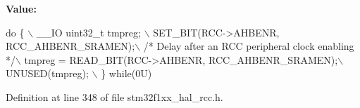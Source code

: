 {\bfseries Value\+:}
\begin{DoxyCode}
\textcolor{keywordflow}{do} \{ \(\backslash\)
                                        \_\_IO uint32\_t tmpreg; \(\backslash\)
                                        SET\_BIT(RCC->AHBENR, RCC\_AHBENR\_SRAMEN);\(\backslash\)
                                        \textcolor{comment}{/* Delay after an RCC peripheral clock enabling */}\(\backslash\)
                                        tmpreg = READ\_BIT(RCC->AHBENR, RCC\_AHBENR\_SRAMEN);\(\backslash\)
                                        UNUSED(tmpreg); \(\backslash\)
                                      \} \textcolor{keywordflow}{while}(0U)
\end{DoxyCode}


Definition at line 348 of file stm32f1xx\+\_\+hal\+\_\+rcc.\+h.

